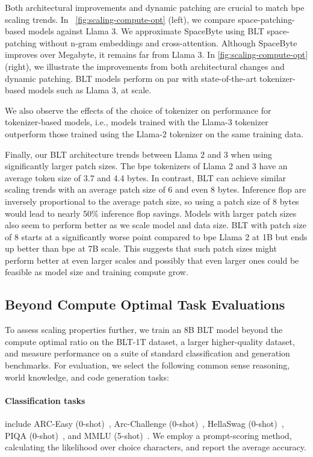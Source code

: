 Both architectural improvements and dynamic patching are crucial to match bpe scaling trends. In ~\autoref{fig:scaling-compute-opt} (left), we compare space-patching-based models against Llama 3. We approximate SpaceByte \citep{slagle2024spacebyte} using {\textsc BLT} space-patching without n-gram embeddings and cross-attention. Although SpaceByte improves over Megabyte, it remains far from  Llama 3. In \autoref{fig:scaling-compute-opt} (right), we illustrate the improvements from both architectural changes and dynamic patching. {\textsc BLT} models perform on par with state-of-the-art tokenizer-based models such as  Llama 3, at scale.

We also observe the effects of the choice of tokenizer on performance for tokenizer-based models, i.e., models trained with the Llama-3 tokenizer outperform those trained using the Llama-2 tokenizer on the same training data.

Finally, our {\textsc BLT} architecture trends between Llama 2 and 3 when using significantly larger patch sizes. The bpe tokenizers of Llama 2 and 3 have an average token size of 3.7 and 4.4 bytes. In contrast, {\textsc BLT} can achieve similar scaling trends with an average patch size of 6 and even 8 bytes. Inference flop are inversely proportional to the average patch size, so using a patch size of 8 bytes would lead to nearly 50\% inference flop savings. Models with larger patch sizes also seem to perform better as we scale model and data size. {\textsc BLT} with patch size of 8 starts at a significantly worse point compared to bpe Llama 2 at 1B but ends up better than bpe at 7B scale. This suggests that such patch sizes might perform better at even larger scales and possibly that even larger ones could be feasible as model size and training compute grow. 

\subsection{Beyond Compute Optimal Task Evaluations}
\label{section:evals}
To assess scaling properties further, we train an 8B {\textsc BLT} model beyond the compute optimal ratio on the {\textsc BLT}-1T dataset, a larger higher-quality dataset, and measure performance on a suite of standard classification and generation benchmarks. For evaluation, we select the following common sense reasoning, world knowledge, and code generation tasks:
\paragraph{Classification tasks} include ARC-Easy (0-shot)~\citep{Eval_ARC}, Arc-Challenge (0-shot)~\citep{Eval_ARC}, HellaSwag (0-shot)~\citep{Eval_hellaswag}, PIQA (0-shot)~\citep{Eval_piqa}, and MMLU (5-shot)~\citep{hendrycks2020measuring}.  We employ a prompt-scoring method, calculating the likelihood over choice characters, and report the average accuracy.
